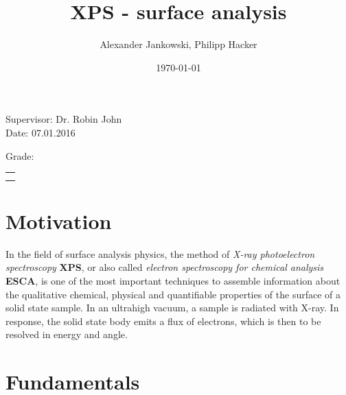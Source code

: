 \documentclass[numbers=noenddot,a4paper,notitlepage,twoside,BCOR15mm]{article}
\title{\fett{\underline{Report:}} XPS - surface analysis} %
\author{Alexander Jankowski, Philipp Hacker}
\date{\today}
\newcommand{\tilt}[1]{\textit{#1}}
\newcommand{\fett}[1]{\textbf{#1}}
\begin{document}
\renewcommand*{\equationautorefname}{eq.}
\renewcommand*{\figureautorefname}{fig.}
\renewcommand*{\tableautorefname}{tab.}
\renewcommand*{\sectionautorefname}{sec.}
\renewcommand*{\subsectionautorefname}{sec.}
\renewcommand*{\subsubsectionautorefname}{sec.}
\renewcommand*{\figurename}{Fig. }
\renewcommand*{\tablename}{Tab.}

\renewcommand*{\figurename}{Figure }
\renewcommand*{\tablename}{Table}

\maketitle
\begin{center}
Supervisor: Dr. Robin John\\ %
	Date: 07.01.2016 \\ %
	\begin{table}[h]
		\centering
		Grade: %
		\begin{tabularx}{1.5cm}{|X|}
			\hline \\ \\
			\hline
		\end{tabularx}
	\end{table}
\end{center}
\vspace*{\fill}
\tableofcontents
\vfill
\clearpage

	\section{Motivation}

	In the field of surface analysis physics, the method of \tilt{X-ray photoelectron spectroscopy} \fett{XPS}, or also called \tilt{electron spectroscopy for chemical analysis} \fett{ESCA}, is one of the most important techniques to assemble information about the qualitative chemical, physical and quantifiable properties of the surface of a solid state sample. In an ultrahigh vacuum, a sample is radiated with X-ray. In response,  the solid state body emits a flux of electrons, which is then to be resolved in energy and angle.\\


	\clearpage
	\section{Fundamentals}
\end{document}
